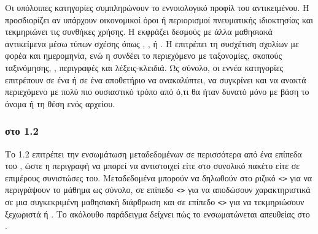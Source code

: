 Οι υπόλοιπες κατηγορίες συμπληρώνουν το εννοιολογικό προφίλ του αντικειμένου. Η  προσδιορίζει αν υπάρχουν οικονομικοί όροι ή περιορισμοί πνευματικής ιδιοκτησίας και τεκμηριώνει τις συνθήκες χρήσης. Η  εκφράζει δεσμούς με άλλα μαθησιακά αντικείμενα μέσω τύπων σχέσης όπως , ,  ή . Η  επιτρέπει τη συσχέτιση σχολίων με φορέα και ημερομηνία, ενώ η  συνδέει το περιεχόμενο με ταξονομίες, σκοπούς ταξινόμησης, , περιγραφές και λέξεις-κλειδιά. Ως σύνολο, οι εννέα κατηγορίες επιτρέπουν σε ένα  ή σε ένα αποθετήριο να ανακαλύπτει, να συγκρίνει και να ανακτά περιεχόμενο με πολύ πιο ουσιαστικό τρόπο από ό,τι θα ήταν δυνατό μόνο με βάση το όνομα ή τη θέση ενός αρχείου.

\subsubsection{ στο  1.2 }

Το  1.2 επιτρέπει την ενσωμάτωση μεταδεδομένων σε περισσότερα από ένα επίπεδα του , ώστε η περιγραφή να μπορεί να αντιστοιχεί είτε στο συνολικό πακέτο είτε σε επιμέρους συνιστώσες του. Μεταδεδομένα μπορούν να δηλωθούν στο ριζικό \texttt{<>} για να περιγράψουν το μάθημα ως σύνολο, σε επίπεδο \texttt{<>} για να αποδώσουν χαρακτηριστικά σε μια συγκεκριμένη μαθησιακή διάρθρωση και σε επίπεδο \texttt{<>} για να τεκμηριώσουν ξεχωριστά  ή . Το ακόλουθο παράδειγμα δείχνει πώς το  ενσωματώνεται απευθείας στο .

